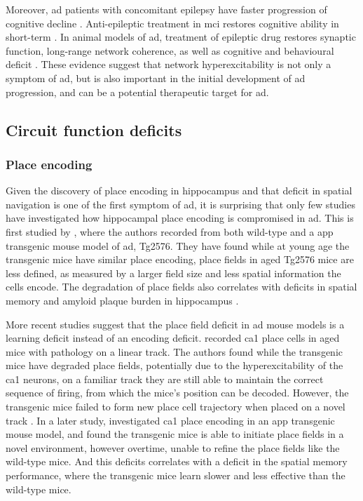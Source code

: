 Moreover, \gls{ad} patients with concomitant epilepsy have faster progression of cognitive decline \citep{vossel13, bakker15}. Anti-epileptic treatment in \gls{mci} restores cognitive ability in short-term \citep{bakker15}. In animal models of \gls{ad}, treatment of epileptic drug restores synaptic function, long-range network coherence, as well as cognitive and behavioural deficit \citep{sanchez12, busche15}. These evidence suggest that network hyperexcitability is not only a symptom of \gls{ad}, but is also important in the initial development of \gls{ad} progression, and can be a potential therapeutic target for \gls{ad}.

\subsection{Circuit function deficits}
\begin{comment}
\subsubsection{synchrony}
\citep{goutagny13}
\end{comment}
\subsubsection{Place encoding}
Given the discovery of place encoding in hippocampus and that deficit in spatial navigation is one of the first symptom of \gls{ad}, it is surprising that only few studies have investigated how hippocampal place encoding is compromised in \gls{ad}. This is first studied by \citet{cacucci08}, where the authors recorded from both wild-type and a \gls{app} transgenic mouse model of \gls{ad}, Tg2576. They have found while at young age the transgenic mice have similar place encoding, place fields in aged Tg2576 mice are less defined, as measured by a larger field size and less spatial information the cells encode. The degradation of place fields also correlates with deficits in spatial memory and amyloid plaque burden in hippocampus \citep{cacucci08}.

More recent studies suggest that the place field deficit in \gls{ad} mouse models is a learning deficit instead of an encoding deficit. \citet{cheng13} recorded \gls{ca1} place cells in aged mice with \atau{} pathology on a linear track. The authors found while the transgenic mice have degraded place fields, potentially due to the hyperexcitability of the \gls{ca1} neurons, on a familiar track they are still able to maintain the correct sequence of firing, from which the mice's position can be decoded. However, the transgenic mice failed to form new place cell trajectory when placed on a novel track \citep{cheng13}. In a later study, \citet{zhao14} investigated \gls{ca1} place encoding in an \gls{app} transgenic mouse model, and found the transgenic mice is able to initiate place fields in a novel environment, however overtime, unable to refine the place fields like the wild-type mice. And this deficits correlates with a deficit in the spatial memory performance, where the transgenic mice learn slower and less effective than the wild-type mice.

